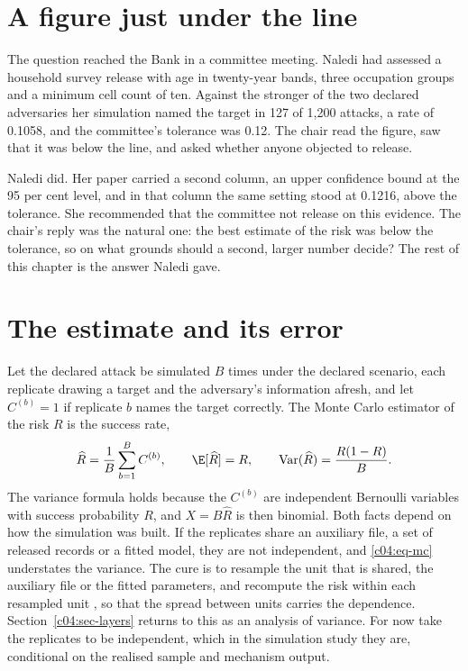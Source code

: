 \section{A figure just under the line}

The question reached the Bank in a committee meeting. Naledi had assessed a household
survey release with age in twenty-year bands, three occupation groups and a minimum cell
count of ten. Against the stronger of the two declared adversaries her simulation named
the target in 127 of 1,200 attacks, a rate of 0.1058, and the committee's tolerance was
0.12.
The chair read the figure, saw that it was below the line, and asked whether anyone
objected to release.

Naledi did. Her paper carried a second column, an upper confidence bound at the 95 per
cent level, and in that column the same setting stood at 0.1216, above the tolerance.
She recommended that the committee not release on this evidence. The chair's reply was
the natural one: the best estimate of the risk was below the tolerance, so on what
grounds should a second, larger number decide? The rest of this chapter is the answer
Naledi gave.

\section{The estimate and its error}

Let the declared attack be simulated $B$ times under the declared scenario, each
replicate drawing a target and the adversary's information afresh, and let
$C^{(b)} = 1$ if replicate $b$ names the target correctly. The Monte Carlo estimator of
the risk $R$ is the success rate,
\begin{equation}\label{c04:eq-mc}
\widehat{R} = \frac{1}{B}\sum_{b=1}^{B} C^{(b)}, \qquad
\E[\widehat{R}] = R, \qquad
\mathrm{Var}(\widehat{R}) = \frac{R(1-R)}{B}.
\end{equation}
The variance formula holds because the $C^{(b)}$ are independent Bernoulli variables
with success probability $R$, and $X = B\widehat{R}$ is then binomial. Both facts
depend on how the simulation was built. If the replicates share an auxiliary file, a
set of released records or a fitted model, they are not independent, and
\eqref{c04:eq-mc} understates the variance. The cure is to resample the unit that is
shared, the auxiliary file or the fitted parameters, and recompute the risk within each
resampled unit \citep{efron1993}, so that the spread between units carries the
dependence. Section~\ref{c04:sec-layers} returns to this as an analysis of variance. For
now take the replicates to be independent, which in the simulation study they are,
conditional on the realised sample and mechanism output.

